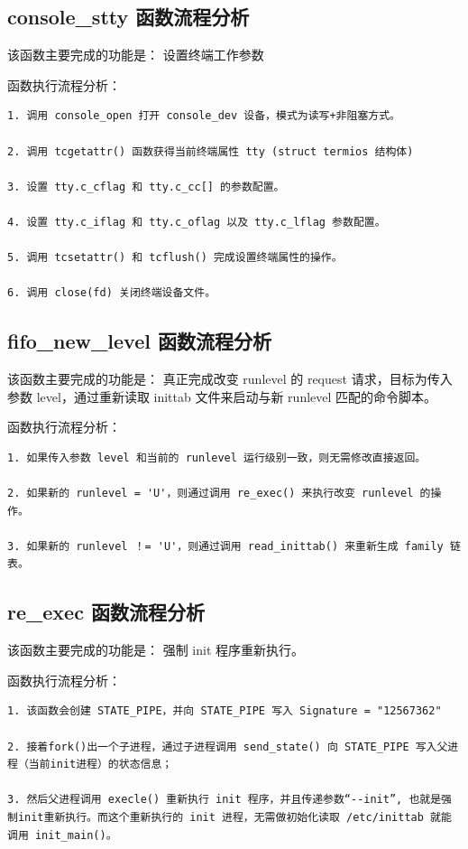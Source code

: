 \subsection{console\_stty 函数流程分析}

该函数主要完成的功能是： 设置终端工作参数

函数执行流程分析：

{\begin{shaded}\begin{verbatim}
1. 调用 console_open 打开 console_dev 设备，模式为读写+非阻塞方式。

2. 调用 tcgetattr() 函数获得当前终端属性 tty (struct termios 结构体)

3. 设置 tty.c_cflag 和 tty.c_cc[] 的参数配置。

4. 设置 tty.c_iflag 和 tty.c_oflag 以及 tty.c_lflag 参数配置。

5. 调用 tcsetattr() 和 tcflush() 完成设置终端属性的操作。

6. 调用 close(fd) 关闭终端设备文件。
\end{verbatim}\end{shaded}}
\subsection{fifo\_new\_level 函数流程分析}

该函数主要完成的功能是： 真正完成改变 runlevel 的 request
请求，目标为传入参数 level，通过重新读取 inittab 文件来启动与新 runlevel
匹配的命令脚本。

函数执行流程分析：

{\begin{shaded}\begin{verbatim}
1. 如果传入参数 level 和当前的 runlevel 运行级别一致，则无需修改直接返回。

2. 如果新的 runlevel = 'U'，则通过调用 re_exec() 来执行改变 runlevel 的操作。

3. 如果新的 runlevel ！= 'U'，则通过调用 read_inittab() 来重新生成 family 链表。
\end{verbatim}\end{shaded}}
\subsection{re\_exec 函数流程分析}

该函数主要完成的功能是： 强制 init 程序重新执行。

函数执行流程分析：

{\begin{shaded}\begin{verbatim}
1. 该函数会创建 STATE_PIPE，并向 STATE_PIPE 写入 Signature = "12567362"

2. 接着fork()出一个子进程，通过子进程调用 send_state() 向 STATE_PIPE 写入父进程（当前init进程）的状态信息；

3. 然后父进程调用 execle() 重新执行 init 程序，并且传递参数“--init”, 也就是强制init重新执行。而这个重新执行的 init 进程，无需做初始化读取 /etc/inittab 就能调用 init_main()。
\end{verbatim}\end{shaded}}
